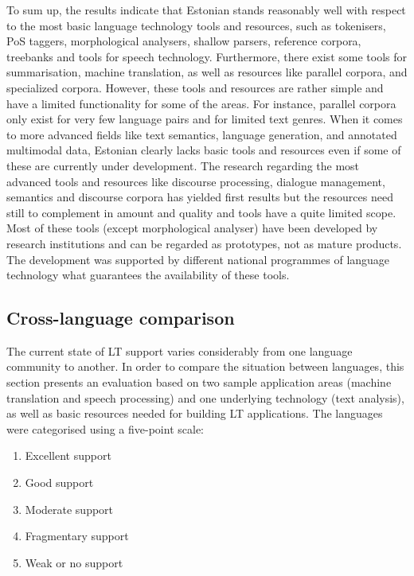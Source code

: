 \begin{multicols}{2}
To sum up, the results indicate that Estonian stands reasonably well with respect to the most basic language technology tools and resources, such as tokenisers, PoS taggers, morphological analysers, shallow parsers, reference corpora, treebanks and tools for speech technology. Furthermore, there exist some tools for summarisation, machine translation, as well as resources like parallel corpora, and specialized corpora. However, these tools and resources are rather simple and have a limited functionality for some of the areas. For instance, parallel corpora only exist for very few language pairs and for limited text genres.
When it comes to more advanced fields like text semantics, language generation, and annotated multimodal data, Estonian clearly lacks basic tools and resources even if some of these are currently under development. 
The research regarding the most advanced tools and resources like discourse processing, dialogue management, semantics and discourse corpora has yielded first results but the resources need still to complement in amount and quality and tools have a quite limited scope.
Most of these tools (except morphological analyser) have been developed by research institutions and can be regarded as prototypes, not as mature products. The development was supported by different national programmes of language technology what guarantees the availability of these tools.

\subsection{Cross-language comparison}

The current state of LT support varies considerably from one language community to another. In order to compare the situation between languages, this section presents an evaluation based on two sample application areas (machine translation and speech processing) and one underlying technology (text analysis), as well as basic resources needed for building LT applications. The languages were categorised using a five-point scale:

\begin{enumerate}
\item Excellent support
\item Good support
\item Moderate support
\item Fragmentary support
\item Weak or no support
\end{enumerate}


\end{multicols}
